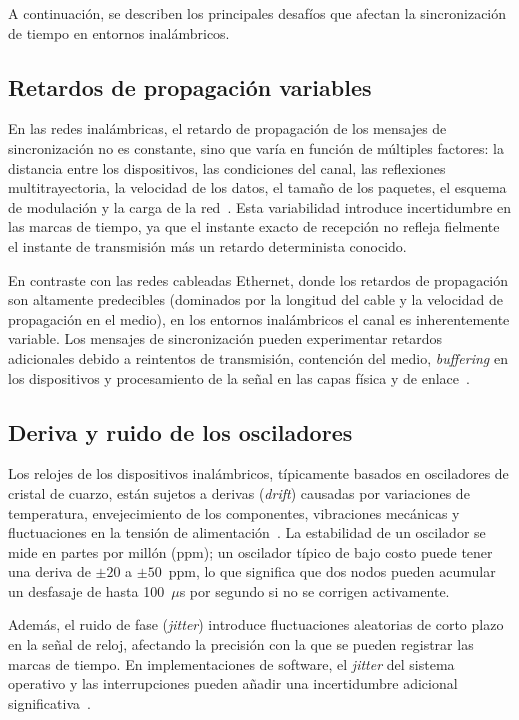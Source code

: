 A continuación, se describen los principales desafíos que afectan la sincronización de tiempo en entornos inalámbricos.

\subsection{Retardos de propagación variables}
\label{sec:1.3.1}

En las redes inalámbricas, el retardo de propagación de los mensajes de sincronización no es constante, sino que varía en función de múltiples factores: la distancia entre los dispositivos, las condiciones del canal, las reflexiones multitrayectoria, la velocidad de los datos, el tamaño de los paquetes, el esquema de modulación y la carga de la red~\cite{seijo2022}. Esta variabilidad introduce incertidumbre en las marcas de tiempo, ya que el instante exacto de recepción no refleja fielmente el instante de transmisión más un retardo determinista conocido.

En contraste con las redes cableadas Ethernet, donde los retardos de propagación son altamente predecibles (dominados por la longitud del cable y la velocidad de propagación en el medio), en los entornos inalámbricos el canal es inherentemente variable. Los mensajes de sincronización pueden experimentar retardos adicionales debido a reintentos de transmisión, contención del medio, \textit{buffering} en los dispositivos y procesamiento de la señal en las capas física y de enlace~\cite{krummacker2020}.

\subsection{Deriva y ruido de los osciladores}
\label{sec:1.3.2}

Los relojes de los dispositivos inalámbricos, típicamente basados en osciladores de cristal de cuarzo, están sujetos a derivas (\textit{drift}) causadas por variaciones de temperatura, envejecimiento de los componentes, vibraciones mecánicas y fluctuaciones en la tensión de alimentación~\cite{tirado2019a}. La estabilidad de un oscilador se mide en partes por millón (ppm); un oscilador típico de bajo costo puede tener una deriva de $\pm 20$ a $\pm 50$~ppm, lo que significa que dos nodos pueden acumular un desfasaje de hasta 100~$\mu$s por segundo si no se corrigen activamente.

Además, el ruido de fase (\textit{jitter}) introduce fluctuaciones aleatorias de corto plazo en la señal de reloj, afectando la precisión con la que se pueden registrar las marcas de tiempo. En implementaciones de software, el \textit{jitter} del sistema operativo y las interrupciones pueden añadir una incertidumbre adicional significativa~\cite{tavares2017}.

